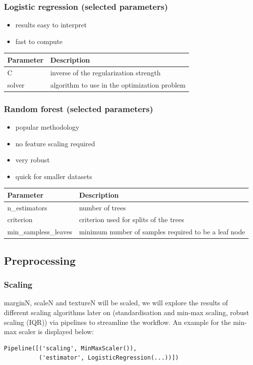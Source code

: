 \documentclass{sig-alternate-05-2015}
\begin{document}
\subsubsection{Logistic regression (selected parameters)}

\begin{itemize}
  \item results easy to interpret
  \item fast to compute
\end{itemize}

\begin{tabular}{|l|l|}
\hline
Parameter & Description \\
\hline
C & inverse of the regularization strength \\
\hline
solver & algorithm to use in the optimization problem \\
\hline
\end{tabular}

\subsubsection{Random forest (selected parameters)}
\begin{itemize}
  \item popular methodology
  \item no feature scaling required
  \item very robust
  \item quick for smaller datasets
\end{itemize}

\begin{tabular}{|l|p{50mm}|}
\hline
Parameter & Description \\
\hline
n\_estimators & number of trees \\
\hline
criterion & criterion used for splits of the trees \\
\hline
min\_sampless\_leaves & minimum number of samples required to be a leaf node \\
\hline
\end{tabular}

\subsection{Preprocessing}

\subsubsection{Scaling}
marginN, scaleN and textureN will be scaled, we will explore the results of different scaling algorithms later on (standardisation and min-max scaling, robust scaling (IQR)) via pipelines to streamline the workflow.
An example for the min-max scaler is displayed below:
\begin{verbatim}
Pipeline([('scaling', MinMaxScaler()),
          ('estimator', LogisticRegression(...))])
\end{verbatim}
\end{document}
